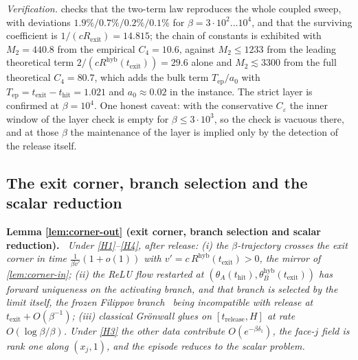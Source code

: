 \documentclass[11pt]{article}
\theoremstyle{definition}
\theoremstyle{remark}
\newcommand{\thit}{t_{\mathrm{hit}}}
\newcommand{\texit}{t_{\mathrm{exit}}}
\newcommand{\trel}{t_{\mathrm{release}}}
\newcommand{\Tep}{T_{\mathrm{ep}}}   %
\newcommand{\hyb}{\mathrm{hyb}}
\newenvironment{lemmarep}[2]{%
  \par\medskip\noindent\textbf{Lemma \ref{#1} (#2).}\itshape\ \ignorespaces}%
  {\par\medskip}
\begin{document}
\noindent\emph{Verification.}  checks that the
two-term law reproduces the whole coupled sweep, with deviations
$1.9\%/0.7\%/0.2\%/0.1\%$ for $\beta=3\cdot10^2\ldots10^4$, and that
the surviving
coefficient is $1/(cR_{\mathrm{exit}})=14.815$; the chain of constants is
exhibited with $M_2=440.8$ from the empirical $C_4=10.6$, against
$M_2\le1233$ from the leading theoretical term $2/(cR^{\hyb}(\texit))=29.6$ alone
and $M_2\lesssim3300$ from the full theoretical $C_4=80.7$, which adds the
bulk term $\Tep/a_0$ with $\Tep=\texit-\thit=1.021$ and $a_0\approx0.02$ in the
instance. The strict layer is
confirmed at $\beta=10^4$. One honest caveat: with the conservative
$C_\varepsilon$ the inner window of the layer check is empty for
$\beta\le3\cdot10^3$, so the check is vacuous there, and at those $\beta$ the
maintenance of the layer is implied only by the detection of the release itself.

\subsection{The exit corner, branch selection and the scalar reduction}\label{app:L6}

\begin{lemmarep}{lem:corner-out}{exit corner, branch selection and scalar reduction}
Under \eqref{H1}--\eqref{H4}, after release: (i) the $\beta$-trajectory crosses
the exit corner in time $\tfrac{1}{\beta v'}(1+o(1))$ with
$v'=c\,R^{\hyb}(\texit)>0$, the mirror of \cref{lem:corner-in}; (ii) the ReLU flow
restarted at $(\theta_A(\thit),\theta_B^{\hyb}(\texit))$ has forward uniqueness on
the activating branch, and that branch is selected by the limit itself, the
frozen Filippov branch~\cite{Fil88} being incompatible with release at
$\texit+O(\beta^{-1})$; (iii) classical Gr\"onwall glues on $[\trel,H]$ at rate
$O(\log\beta/\beta)$. Under \eqref{H3} the other data contribute
$O(e^{-\beta\delta_1})$, the face-$j$ field is rank one along $(x_j,1)$, and the
episode reduces to the scalar problem.
\end{lemmarep}
\end{document}
